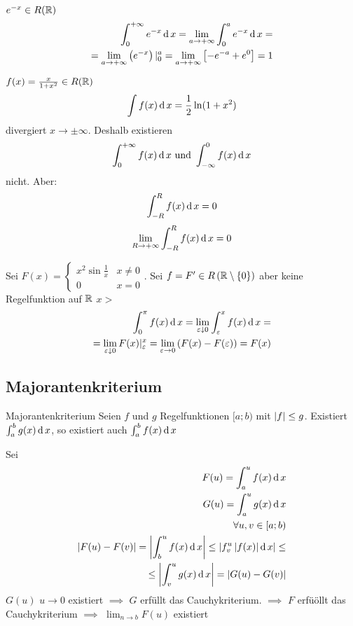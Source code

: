 \begin{Bsp}
  $e^{-x}\in R(\mathbb{R})$
  \begin{align*}
    \int_0^{+\infty}e^{-x}\operatorname{d} x=\lim_{a\to+\infty}\int_0^ae^{-x}\operatorname{d} x=\\
    =\lim_{a\to+\infty}\left( e^{-x} \right)|^a_0=\lim_{a\to+\infty}\left[ -e^{-a}+e^0 \right]=1
  \end{align*}
\end{Bsp}
\begin{Bsp}
  $f(x)=\frac{x}{1+x^2}\in R(\mathbb{R})$
  \begin{align*}
    \int f(x)\operatorname{d} x=\frac{1}{2}\ln (1+x^2)
  \end{align*}
  divergiert $x\to\pm\infty$. Deshalb existieren
  \[\int_0^{+\infty}f(x)\operatorname{d} x\ \text{und}\ \int^0_{-\infty}f(x)\operatorname{d} x\]
  nicht. Aber:
  \[\int_{-R}^Rf(x)\operatorname{d} x=0\]
  \[\lim_{R\to+\infty}\int^R_{-R}f(x)\operatorname{d} x=0\]
\end{Bsp}
\begin{Bsp}
  Sei $F(x) = \begin{cases}
    x^2\sin\frac{1}{x}&x\neq 0\\
    0 & x=0
  \end{cases}$.
  Sei $f=F'\in R\left(\mathbb{R}\setminus \{0\}\right)$ aber keine Regelfunktion auf $\mathbb{R}$ $x>$
  \begin{align*}
    \int^\pi_0f(x)\operatorname{d} x=\lim_{\varepsilon\downarrow 0}\int^x_\varepsilon f(x)\operatorname{d} x=\\
    =\lim_{\varepsilon\downarrow 0}F(x)|^x_\varepsilon=\lim_{\varepsilon\to 0}\left( F(x)-F(\varepsilon) \right)=F(x)
  \end{align*}
\end{Bsp}
\subsection{Majorantenkriterium}
\begin{Sat}{Majorantenkriterium}
  Seien $f$ und $g$ Regelfunktionen $[a;b)$ mit $\left| f \right|\leq g$. Existiert $\int_a^b g(x)\operatorname{d} x$, so existiert auch $\int^b_a f(x)\operatorname{d} x$  
\end{Sat}
\begin{Bew}
  Sei
  \begin{align*}
    F(u)=\int^u_af(x)\operatorname{d} x\\
    G(u)=\int^u_ag(x)\operatorname{d} x\\
    \forall u,v\in [a;b)\\
    \left| F(u)-F(v) \right|=\left| \int^u_bf(x)\operatorname{d} x \right|\leq \left| f^u_v\left| f(x) \right|\operatorname{d} x \right|\leq\\
    \leq \left| \int^u_vg(x)\operatorname{d} x \right|=\left| G(u)-G(v) \right|
  \end{align*}
  $G(u)$ $u\to 0$ existiert $\implies$ $G$ erfüllt das Cauchykriterium. $\implies$ $F$ erfüöllt das Cauchykriterium $\implies$ $\lim_{n\to b}F(u)$ existiert
\end{Bew}
